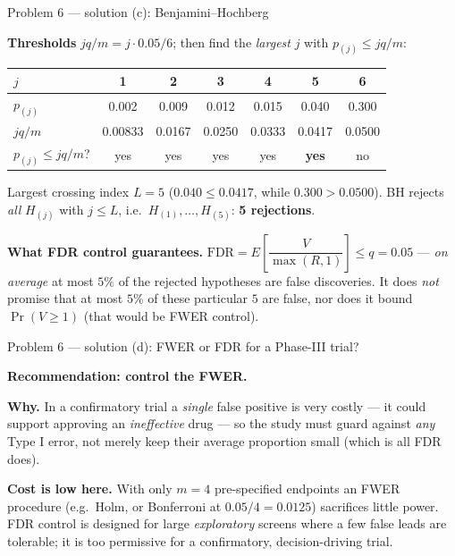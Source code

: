 \documentclass[aspectratio=169,11pt]{beamer}
\begin{document}
\begin{frame}{Problem 6 --- solution (c): Benjamini--Hochberg}
  \begin{solutionbox}
    \textbf{Thresholds} $jq/m=j\cdot 0.05/6$; then find the \emph{largest} $j$ with $p_{(j)}\le jq/m$:
    \begin{center}\footnotesize
    \begin{tabular}{lcccccc}
      \toprule
      $j$ & 1 & 2 & 3 & 4 & 5 & 6\\
      \midrule
      $p_{(j)}$ & 0.002 & 0.009 & 0.012 & 0.015 & 0.040 & 0.300\\
      $jq/m$ & 0.00833 & 0.0167 & 0.0250 & 0.0333 & 0.0417 & 0.0500\\
      $p_{(j)}\le jq/m$? & yes & yes & yes & yes & \textbf{yes} & no\\
      \bottomrule
    \end{tabular}
    \end{center}
    Largest crossing index $L=5$ ($0.040\le0.0417$, while $0.300>0.0500$). BH rejects \emph{all}
    $H_{(j)}$ with $j\le L$, i.e.\ $H_{(1)},\dots,H_{(5)}$: \textbf{5 rejections}.
    \medskip

    \textbf{What FDR control guarantees.}
    $\text{FDR}=E\!\left[\dfrac{V}{\max(R,1)}\right]\le q=0.05$ --- \emph{on average} at most $5\%$
    of the rejected hypotheses are false discoveries. It does \emph{not} promise that at most $5\%$
    of these particular $5$ are false, nor does it bound $\Pr(V\ge1)$ (that would be FWER control).
  \end{solutionbox}
\end{frame}

\begin{frame}{Problem 6 --- solution (d): FWER or FDR for a Phase-III trial?}
  \begin{solutionbox}
    \textbf{Recommendation: control the FWER.}
    \medskip

    \textbf{Why.} In a confirmatory trial a \emph{single} false positive is very costly --- it could
    support approving an \emph{ineffective} drug --- so the study must guard against \emph{any}
    Type I error, not merely keep their average proportion small (which is all FDR does).
    \medskip

    \textbf{Cost is low here.} With only $m=4$ pre-specified endpoints an FWER procedure (e.g.\ Holm,
    or Bonferroni at $0.05/4=0.0125$) sacrifices little power. FDR control is designed for large
    \emph{exploratory} screens where a few false leads are tolerable; it is too permissive for a
    confirmatory, decision-driving trial.
  \end{solutionbox}
\end{frame}
\end{document}
